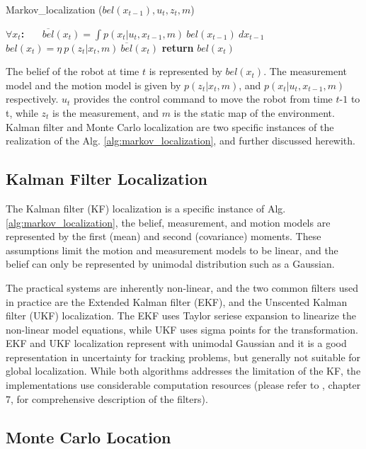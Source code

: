 \documentclass[10pt,journal,compsoc]{IEEEtran}
\begin{document}
\begin{algorithm}
\caption{Markov\_localization ($bel(x_{t-1}), u_t, z_t, m$)}\label{euclid}
\label{alg:markov_localization}
\begin{algorithmic}
\STATE  $\forall x_t$\textbf{:}
\STATE ~~~$\overline{bel}(x_t) = \int p(x_t | u_t, x_{t-1}, m)~bel(x_{t-1})~ dx_{t-1}$
\STATE ~~~$bel(x_t) = \eta~p(z_t | x_t, m)~\overline{bel}(x_t)$
\STATE \textbf{return} $bel(x_t)$
\end{algorithmic}
\end{algorithm}

The belief of the robot at time $t$ is represented by $bel(x_t)$. The measurement model and the motion model is given by $p(z_t | x_t, m)$, and $p(x_t | u_t, x_{t-1}, m)$ respectively. $u_t$ provides the control command to move the robot from time $t$-$1$ to t, while $z_t$ is the measurement, and $m$ is the static map of the environment. Kalman filter and Monte Carlo localization are two specific instances of the realization of the Alg. \ref{alg:markov_localization}, and further discussed herewith.   

\subsection{Kalman Filter Localization}
\label{sub:kfl}

The Kalman filter (KF) localization is a specific instance of Alg. \ref{alg:markov_localization}, the belief, measurement, and motion models are represented by the first (mean) and second (covariance) moments.  These assumptions limit the motion and measurement models to be linear, and the belief can only be represented by unimodal distribution such as a Gaussian. 

The practical systems are inherently non-linear, and the two common filters used in practice are the Extended Kalman filter (EKF), and the Unscented Kalman filter (UKF) localization. The EKF uses Taylor seriese expansion to linearize the non-linear model equations, while UKF uses sigma points for the transformation.  EKF and UKF localization represent with unimodal Gaussian and it is a good representation in uncertainty  for tracking problems, but generally not suitable for global localization. While  both algorithms addresses the limitation of the KF, the implementations use considerable computation resources (please refer to \cite{Thrun:2005:PR:1121596}, chapter 7, for comprehensive description of the filters).   

\subsection{Monte Carlo Location}
\label{sub:mcl}
\end{document}
